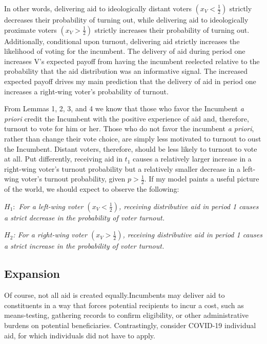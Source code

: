 \documentclass[12pt]{paper}
\begin{document}
In other words, delivering aid to ideologically distant voters $(x_V < \frac{1}{2})$ strictly decreases their probability of turning out, while delivering aid to ideologically proximate voters $(x_V > \frac{1}{2})$  strictly increases their probability of turning out. Additionally, conditional upon turnout, delivering aid strictly increases the likelihood of voting for the incumbent. The delivery of aid during period one increases V’s expected payoff from having the incumbent reelected relative to the probability that the aid distribution was an informative signal. The increased expected payoff drives my main prediction that the delivery of aid in period one increases a right-wing voter's probability of turnout.

From Lemmas 1, 2, 3, and 4 we know that those who favor the Incumbent \emph{a priori} credit the Incumbent with the positive experience of aid and, therefore, turnout to vote for him or her. Those who do not favor the incumbent \emph{a priori}, rather than change their vote choice, are simply less motivated to turnout to oust the Incumbent. Distant voters, therefore, should be less likely to turnout to vote at all. Put differently, receiving aid in $t_1$ causes a relatively larger increase in a right-wing voter’s turnout probability but a relatively smaller decrease in a left-wing voter’s turnout probability, given $p > \frac{1}{2}$. If my model paints a useful picture of the world, we should expect to observe the following:

\emph{$H_1:$ For a left-wing voter $(x_V < \frac{1}{2})$, receiving distributive aid in period 1 causes a strict decrease in the probability of voter turnout.}

\emph{$H_2$: For a right-wing voter $(x_V > \frac{1}{2})$, receiving distributive aid in period 1 causes a strict increase in the probability of voter turnout.}

\subsection{Expansion}
Of course, not all aid is created equally.Incumbents may deliver aid to constituents in a way that forces potential recipients to incur a cost, such as means-testing, gathering records to confirm eligibility, or other administrative burdens on potential beneficiaries. Contrastingly, consider COVID-19 individual aid, for which individuals did not have to apply.
\end{document}
